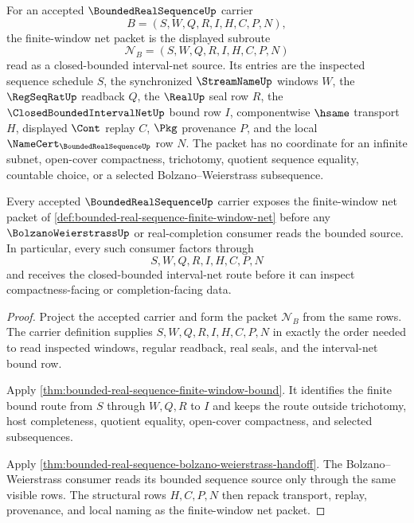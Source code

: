 \begin{definition}
\label{def:bounded-real-sequence-finite-window-net}
For an accepted $\BoundedRealSequenceUp$ carrier
$$
B=(S,W,Q,R,I,H,C,P,N),
$$
the finite-window net packet is the displayed subroute
$$
\mathcal{N}_B=(S,W,Q,R,I,H,C,P,N)
$$
read as a closed-bounded interval-net source. Its entries are the inspected sequence schedule $S$, the synchronized $\StreamNameUp$ windows $W$, the $\RegSeqRatUp$ readback $Q$, the $\RealUp$ seal row $R$, the $\ClosedBoundedIntervalNetUp$ bound row $I$, componentwise $\hsame$ transport $H$, displayed $\Cont$ replay $C$, $\Pkg$ provenance $P$, and the local $\NameCert_{\BoundedRealSequenceUp}$ row $N$. The packet has no coordinate for an infinite subnet, open-cover compactness, trichotomy, quotient sequence equality, countable choice, or a selected Bolzano--Weierstrass subsequence.
\end{definition}

\begin{theorem}
\label{thm:bounded-real-sequence-finite-window-net-extraction}
Every accepted $\BoundedRealSequenceUp$ carrier exposes the finite-window net packet of \autoref{def:bounded-real-sequence-finite-window-net} before any $\BolzanoWeierstrassUp$ or real-completion consumer reads the bounded source. In particular, every such consumer factors through
$$
S,W,Q,R,I,H,C,P,N
$$
and receives the closed-bounded interval-net route before it can inspect compactness-facing or completion-facing data.
\end{theorem}
\begin{proof}
Project the accepted carrier and form the packet $\mathcal{N}_B$ from the same rows. The carrier definition supplies $S,W,Q,R,I,H,C,P,N$ in exactly the order needed to read inspected windows, regular readback, real seals, and the interval-net bound row.

Apply \autoref{thm:bounded-real-sequence-finite-window-bound}. It identifies the finite bound route from $S$ through $W,Q,R$ to $I$ and keeps the route outside trichotomy, host completeness, quotient equality, open-cover compactness, and selected subsequences.

Apply \autoref{thm:bounded-real-sequence-bolzano-weierstrass-handoff}. The Bolzano--Weierstrass consumer reads its bounded sequence source only through the same visible rows. The structural rows $H,C,P,N$ then repack transport, replay, provenance, and local naming as the finite-window net packet.
\end{proof}

